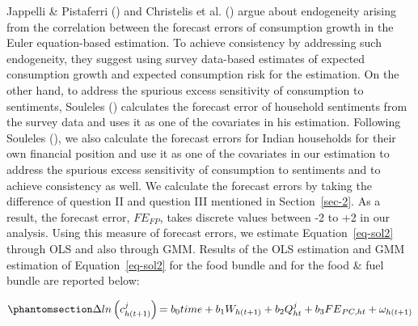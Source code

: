 \documentclass[
  abstract]{scrartcl}
\begin{document}
Jappelli \& Pistaferri () and
Christelis et al. () argue about
endogeneity arising from the correlation between the forecast errors of
consumption growth in the Euler equation-based estimation. To achieve
consistency by addressing such endogeneity, they suggest using survey
data-based estimates of expected consumption growth and expected
consumption risk for the estimation. On the other hand, to address the
spurious excess sensitivity of consumption to sentiments, Souleles
() calculates the
forecast error of household sentiments from the survey data and uses it
as one of the covariates in his estimation. Following Souleles
(), we also calculate the
forecast errors for Indian households for their own financial position
and use it as one of the covariates in our estimation to address the
spurious excess sensitivity of consumption to sentiments and to achieve
consistency as well. We calculate the forecast errors by taking the
difference of question II and question III mentioned in
Section~\ref{sec-2}. As a result, the forecast error, \(FE_{FP}\), takes
discrete values between -2 to +2 in our analysis. Using this measure of
forecast errors, we estimate Equation~\ref{eq-sol2} through OLS and also
through GMM. Results of the OLS estimation and GMM estimation of
Equation~\ref{eq-sol2} for the food bundle and for the food \& fuel
bundle are reported below:

\begin{equation}\phantomsection\label{eq-sol2}{
\Delta ln\left(c_{h\left(t+1\right)}^j\right){=b_0time+b_1W_{h\left(t+1\right)}}+b_2Q_{ht}^j+b_3{FE}_{PC,ht}+\omega_{h\left(t+1\right)}
}\end{equation}

\FloatBarrier
\end{document}

